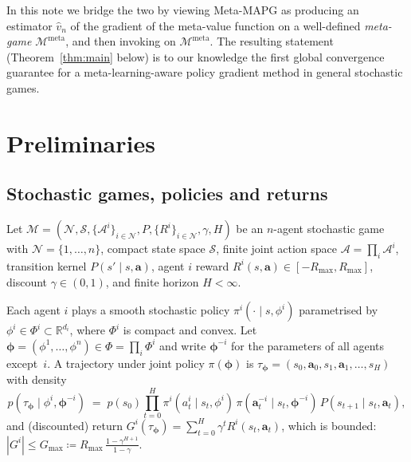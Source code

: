 \documentclass[11pt]{article}
\theoremstyle{definition}
\newcommand{\R}{\mathbb{R}}
\newcommand{\calN}{\mathcal{N}}
\newcommand{\calS}{\mathcal{S}}
\newcommand{\calA}{\mathcal{A}}
\newcommand{\calM}{\mathcal{M}}
\newcommand{\meta}{\mathrm{meta}}
\begin{document}
In this note we bridge the two by viewing Meta-MAPG as producing an estimator $\hat v_n$ of the gradient of the meta-value function on a well-defined \emph{meta-game} $\calM^{\meta}$, and then invoking \cite[Theorem~1]{Giannou2022} on $\calM^{\meta}$. The resulting statement (Theorem~\ref{thm:main} below) is to our knowledge the first global convergence guarantee for a meta-learning-aware policy gradient method in general stochastic games.

\section{Preliminaries}

\subsection{Stochastic games, policies and returns}

Let $\calM=(\calN,\calS,\{\calA^i\}_{i\in\calN},P,\{R^i\}_{i\in\calN},\gamma,H)$ be an $n$-agent stochastic game with $\calN=\{1,\dots,n\}$, compact state space $\calS$, finite joint action space $\calA=\prod_i\calA^i$, transition kernel $P(s'\mid s,\bm a)$, agent $i$ reward $R^i(s,\bm a)\in[-R_{\max},R_{\max}]$, discount $\gamma\in(0,1)$, and finite horizon $H<\infty$.

Each agent $i$ plays a smooth stochastic policy $\pi^i(\cdot\mid s,\phi^i)$ parametrised by $\phi^i\in\Phi^i\subset\R^{d_i}$, where $\Phi^i$ is compact and convex. Let $\bm\phi=(\phi^1,\dots,\phi^n)\in\Phi=\prod_i\Phi^i$ and write $\bm\phi^{-i}$ for the parameters of all agents except~$i$. A trajectory under joint policy $\pi(\bm\phi)$ is $\tau_{\bm\phi}=(s_0,\bm a_0,s_1,\bm a_1,\dots,s_H)$ with density
\begin{equation}\label{eq:traj-density}
p(\tau_{\bm\phi}\mid\phi^i,\bm\phi^{-i})
\;=\;
p(s_0)\prod_{t=0}^{H}\pi^i(a_t^i\mid s_t,\phi^i)\,\pi(\bm a_t^{-i}\mid s_t,\bm\phi^{-i})\,P(s_{t+1}\mid s_t,\bm a_t),
\end{equation}
and (discounted) return $G^i(\tau_{\bm\phi})=\sum_{t=0}^H \gamma^t R^i(s_t,\bm a_t)$, which is bounded: $|G^i|\le G_{\max}\coloneqq R_{\max}\,\frac{1-\gamma^{H+1}}{1-\gamma}$.

\end{document}
